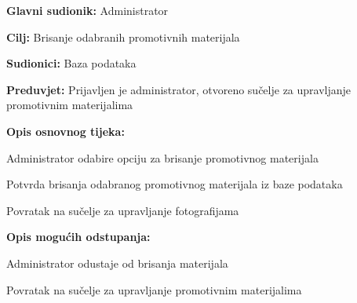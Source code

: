 					\noindent {}
					\begin{packed_item}
						
						\item \textbf{Glavni sudionik: }Administrator
						\item  \textbf{Cilj:} Brisanje odabranih promotivnih materijala
						\item  \textbf{Sudionici:} Baza podataka
						\item  \textbf{Preduvjet:} Prijavljen je administrator, otvoreno sučelje za upravljanje promotivnim materijalima
						\item  \textbf{Opis osnovnog tijeka:}
						
						\item[] \begin{packed_enum}
							
							\item Administrator odabire opciju za brisanje promotivnog materijala
							\item Potvrda brisanja odabranog promotivnog materijala iz baze podataka
							\item Povratak na sučelje za upravljanje fotografijama
						\end{packed_enum}
						
						\item  \textbf{Opis mogućih odstupanja:}
						
						\item[] \begin{packed_item}
							
							\item[2.a] Administrator odustaje od brisanja materijala
							\item[] \begin{packed_enum}
								
								\item Povratak na sučelje za upravljanje promotivnim materijalima
								
							\end{packed_enum}
							
						\end{packed_item}
					\end{packed_item}
					
